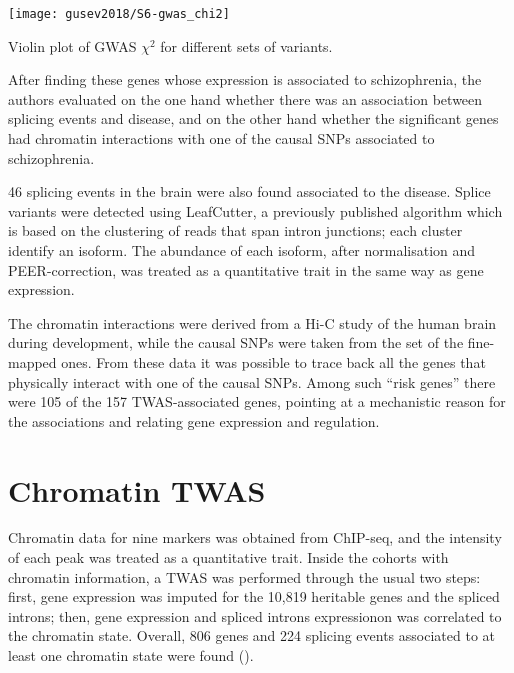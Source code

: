 \documentclass[../main.tex]{subfiles}
\begin{document}
\begin{marginfigure}
	\texttt{[image: gusev2018/S6-gwas\_chi2]}
	\caption{Violin plot of GWAS $\chi^2$ for different sets of 
variants.}
\end{marginfigure}

After finding these genes whose expression is associated to 
schizophrenia, the authors evaluated on the one hand whether there was 
an association between splicing events and disease, and on the other 
hand whether the significant genes had chromatin interactions with one 
of the causal SNPs associated to schizophrenia.

46 splicing events in the brain were also found associated to the 
   disease. Splice variants were detected using LeafCutter, a previously 
published algorithm which is based on the clustering of reads that span 
intron junctions; each cluster identify an isoform. The abundance of 
each isoform, after normalisation and PEER-correction, was treated as a 
quantitative trait in the same way as gene expression.

The chromatin interactions were derived from a Hi-C study of the human 
brain during development, while the causal SNPs were taken from the set 
of the fine-mapped ones. From these data it was possible to trace back all the genes 
that physically interact with one of the causal SNPs. Among such 
\enquote{risk genes} there were 
105 of the 157 TWAS-associated genes, pointing at a mechanistic reason 
for the associations and relating gene expression and regulation.

\section{Chromatin TWAS}

Chromatin data for nine markers was obtained from 
ChIP-seq, and the intensity of each peak was treated as a quantitative trait. 
Inside the cohorts with chromatin information, a TWAS was performed 
through the usual two steps: first, gene expression was imputed for the 
10,819 heritable genes and the spliced introns; then, gene expression 
and spliced introns expressionon was correlated to the chromatin state. 
Overall, 806 genes and 224 splicing events associated to at least one 
chromatin state were found ().
\end{document}
